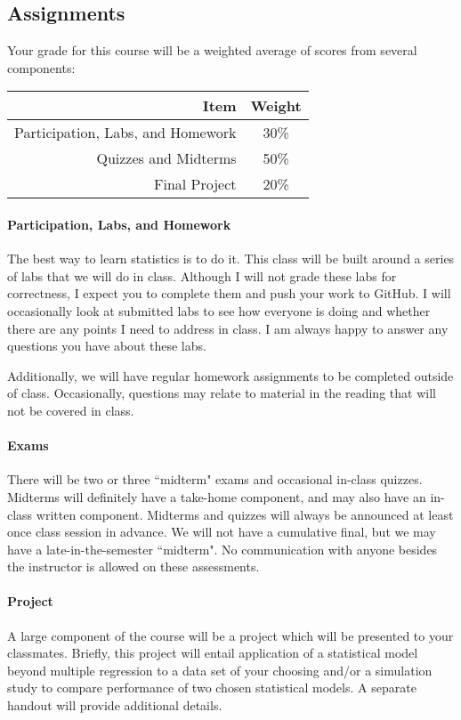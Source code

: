 \documentclass[11pt]{article}
\begin{document}
\subsection*{Assignments}

Your grade for this course will be a weighted average of scores from several components:

\begin{table}[!h]
\centering
\begin{tabular}{r c}
\toprule
Item & Weight \\
\midrule
Participation, Labs, and Homework & 30\% \\
\cmidrule(r){1-2}
\cmidrule(r){1-2}
Quizzes and Midterms & 50\% \\
\cmidrule(r){1-2}
Final Project & 20\% \\
\bottomrule
\end{tabular}
\end{table}

\paragraph{Participation, Labs, and Homework}
The best way to learn statistics is to do it.  This class will be built around a series of labs that we will do in class.  Although I will not grade these labs for correctness, I expect you to complete them and push your work to GitHub.  I will occasionally look at submitted labs to see how everyone is doing and whether there are any points I need to address in class.  I am always happy to answer any questions you have about these labs.

Additionally, we will have regular homework assignments to be completed outside of class.
Occasionally, questions may relate to material in the reading that will not be covered in class.

\paragraph{Exams}
There will be two or three ``midterm" exams and occasional in-class quizzes.
Midterms will definitely have a take-home component, and may also have an in-class written component.
Midterms and quizzes will always be announced at least once class session in advance.
We will not have a cumulative final, but we may have a late-in-the-semester ``midterm".
No communication with anyone besides the instructor is allowed on these assessments.

\paragraph{Project}
A large component of the course will be a project which will be presented to your classmates.
Briefly, this project will entail application of a statistical model beyond multiple regression to a data set of your choosing and/or a simulation study to compare performance of two chosen statistical models.
A separate handout will provide additional details.
\end{document}
